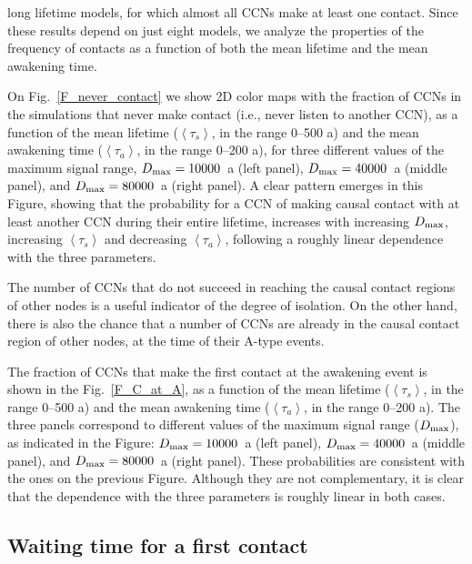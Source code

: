 \documentclass[crop]{CSLB}
\newcommand{\ceti}{CCN}
\newcommand{\cetis}{CCNs}
\newcommand{\ffn}[1]{}
\begin{document}
long lifetime models, for which almost all \cetis{} make at least one
contact.
%
Since these results depend on just eight models, we analyze the
properties of the frequency of contacts as a function of both the mean
lifetime and the mean awakening time.
%
\ffn{4}
%
On Fig.~\ref{F_never_contact} we show 2D color maps with the fraction
of \cetis{} in the simulations that never make contact (i.e., never
listen to another \ceti{}), as a function of the mean lifetime
($\left<\tau_s\right>$, in the range 0--500 a) and the mean awakening
time ($\left<\tau_a\right>$, in the range 0--200 a), for three
different values of the maximum signal range, $D_{\rm max}=10000$~a (left
panel), $D_{\rm max}=40000$~a (middle panel), and $D_{\rm
max}=80000$~a
(right panel).
%
A clear pattern emerges in this Figure, showing that the probability
for a \ceti{} of making causal contact with at least another \ceti{}
during their entire lifetime, increases with increasing $D_{\rm max}$,
increasing $\left<\tau_s\right>$ and decreasing $\left<\tau_a\right>$,
following a roughly linear dependence with the three parameters.


The number of \cetis{} that do not succeed in reaching the
causal contact regions of other nodes is a useful indicator of
the
degree of isolation.
%
On the other hand, there is also the chance that a number of
\cetis{} are already in the causal contact region of other nodes,
at the time of their A-type events.
%
\ffn{5}
%
The fraction of \cetis{} that make the first contact at the awakening
event is shown in the Fig.~\ref{F_C_at_A}, 
as a function of the mean lifetime
($\left<\tau_s\right>$, in the range 0--500 a) and the mean awakening
time ($\left<\tau_a\right>$, in the range 0--200 a).
%
The three panels correspond to different values of the maximum signal
range ($D_{\rm max}$),
as indicated in the Figure:
%
$D_{\rm max}=10000$~a (left
panel), $D_{\rm max}=40000$~a (middle panel), and $D_{\rm
max}=80000$~a
(right panel).
%
These probabilities are consistent with the ones on the previous
Figure.
%
Although they are not complementary, it is clear that the dependence
with the three parameters is roughly linear in both cases.
%


%


\subsection{Waiting time for a first contact}\label{SS_waiting}
\end{document}

